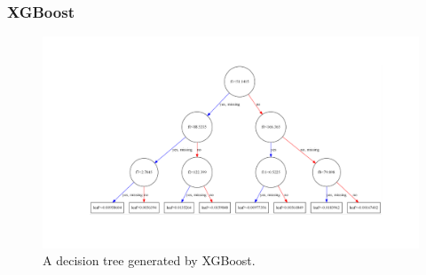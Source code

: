 \begin{frame}
	\frametitle{XGBoost}
	\begin{center}
	\begin{figure}
		\includegraphics[trim=146 100 118 90, clip, width=\textwidth]{images/tree.pdf}
\caption{A decision tree generated by XGBoost.}
	\end{figure}
	\end{center}

\end{frame}